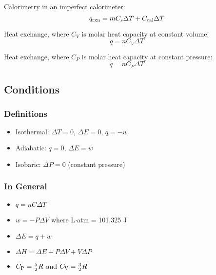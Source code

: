 \documentclass[10pt]{article}
\begin{document}
Calorimetry in an imperfect calorimeter:
\begin{equation*}
q_\textnormal{rxn}=mC_s\Delta T + C_\textnormal{cal}\Delta T
\end{equation*}

Heat exchange, where $C_V$ is molar heat capacity at constant volume:
\begin{equation*}
q= nC_V\Delta T
\end{equation*}

Heat exchange, where $C_P$ is molar heat capacity at constant pressure:
\begin{equation*}
q= nC_P\Delta T
\end{equation*}


\subsection{Conditions}

\subsubsection{Definitions}
\begin{itemize}
    \item Isothermal: $\Delta T = 0$, $\Delta E = 0$, $q = -w$
    \item Adiabatic: $q = 0$, $\Delta E = w$
    \item Isobaric: $\Delta P = 0$ (constant pressure)
\end{itemize}

\subsubsection{In General}
\begin{itemize}
    \item $q = nC\Delta T$
    \item $w = -P\Delta V$ where L$\cdot$atm = 101.325 J
    \item $\Delta E = q + w$
    \item $\Delta H = \Delta E + P\Delta V + V\Delta P$
    \item $C_\textnormal{P} = \frac{5}{2}R$ and $C_\textnormal{V} = \frac{3}{2}R$
\end{itemize}
\end{document}
